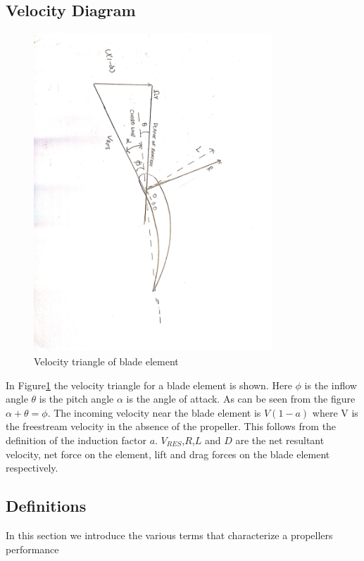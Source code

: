 \documentclass[main.tex]{subfiles}
\begin{document}
\subsection{Velocity Diagram}
\begin{figure}[h!]
\vspace*{-0.5em}\centering
\includegraphics[angle=90,width=0.8\textwidth]{./Images/Ass5/VelocityTriangle}
\caption{Velocity triangle of blade element}\vspace*{-0.5em}
\label{fig3}
\end{figure}\vspace*{-1.0em}
In Figure\ref{fig3} the velocity triangle for a blade element is shown. Here $\phi$ is the inflow angle $\theta$ is the pitch angle $\alpha$ is the angle of attack. 
As can be seen from the figure 
$ \alpha + \theta = \phi$. The incoming velocity near the blade element is $V(1 - a)$ where V is the freestream velocity in the absence of the propeller. This follows from the definition of the induction factor $a$. $V_{RES}$,$R$,$L$ and $D$
are the net resultant velocity, net force on the element, lift and drag forces on the blade element respectively.
\subsection{Definitions}
In this section we introduce the various terms that characterize a propellers performance
\end{document}
